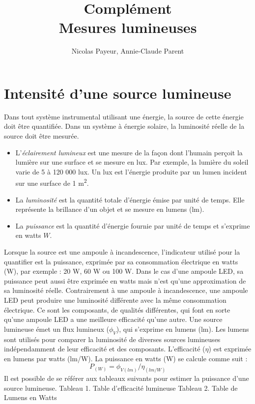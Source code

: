 \documentclass[12pt,oneside,letterpaper]{article}
\begin{document}
\title{\textbf{Complément}\\Mesures lumineuses}
\author{Nicolas Payeur, Annie-Claude Parent}
\date{}
\maketitle


\section{Intensité d'une source lumineuse}

Dans tout système instrumental utilisant une énergie, la source de cette énergie doit être quantifiée. Dans un système à énergie solaire, la luminosité réelle de la source doit être mesurée. 

\begin{itemize}
\item L'\textit{éclairement lumineux} est une mesure de la façon dont l'humain perçoit la lumière sur une surface et se mesure en lux. Par exemple, la lumière du soleil varie de 5 à 120 000 lux. Un lux est l'énergie produite par un lumen incident sur une surface de 1 m\textsuperscript{2}. 
\item La \textit{luminosité} est la quantité totale d'énergie émise par unité de temps. Elle représente la brillance d'un objet et se mesure en lumens (lm). 
\item La \textit{puissance} est la quantité d'énergie fournie par unité de temps et s'exprime en watts $W$. 
\end{itemize}

Lorsque la source est une ampoule à incandescence, l’indicateur utilisé pour la quantifier est la puissance, exprimée par sa consommation électrique en watts (W), par exemple : 20 W, 60 W ou 100 W. Dans le cas d’une ampoule LED, sa puissance peut aussi être exprimée en watts mais n’est qu’une approximation de sa luminosité réelle. Contrairement à une ampoule à incandescence, une ampoule LED peut produire une luminosité différente avec la même consommation électrique. Ce sont les composants, de qualités différentes, qui font en sorte qu’une ampoule LED a une meilleure efficacité qu’une autre. 
Une source lumineuse émet un flux lumineux ($\phi_V$), qui s’exprime en lumens (lm). Les lumens sont utilisés pour comparer la luminosité de diverses sources lumineuses indépendamment de leur efficacité et des composants. L'efficacité ($\eta$) est exprimée en lumens par watts (lm/W). La puissance en watts (W) se calcule comme suit : 
\begin{equation}
P_{(W)}=\phi_{V(lm)}/\eta_{(lm/W)}		
\end{equation}
Il est possible de se référer aux tableaux suivants pour estimer la puissance d’une source lumineuse. 
Tableau 1. Table d’efficacité lumineuse
Tableau 2. Table de Lumens en Watts
\end{document}
